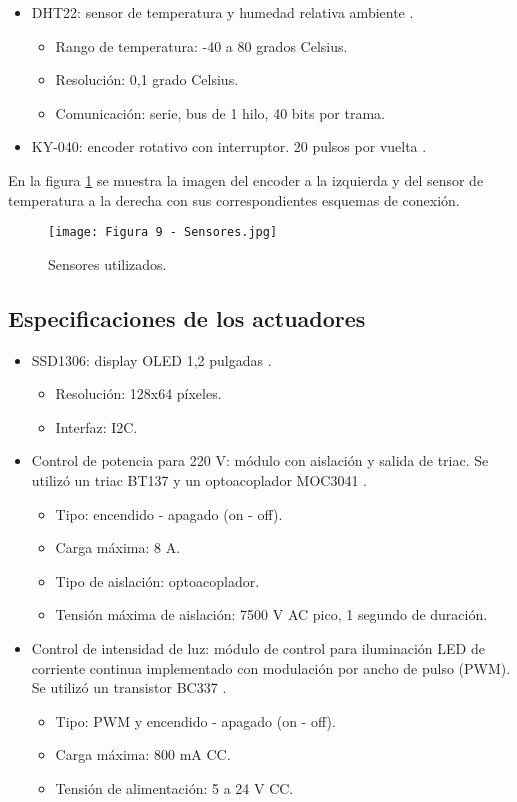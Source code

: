 \begin{itemize}
	\item DHT22: sensor de temperatura y humedad relativa ambiente \citep{15}.
	\begin{itemize}
		\item Rango de temperatura: -40 a 80 grados Celsius.
		\item Resolución: 0,1 grado Celsius.
		\item Comunicación: serie, bus de 1 hilo, 40 bits por trama.
	\end{itemize}
	\item KY-040: encoder rotativo con interruptor. 20 pulsos por vuelta \citep{16}.
\end{itemize}

En la figura \ref{fig:9} se muestra la imagen del encoder a la izquierda y del sensor de temperatura a la derecha con sus correspondientes esquemas de conexión.

\newpage
\begin{figure}[h]
\centering
\texttt{[image: Figura 9 - Sensores.jpg]}
\caption[Sensores]{Sensores utilizados.}
\label{fig:9}
\end{figure}

\subsection{Especificaciones de los actuadores}

\begin{itemize}
\item SSD1306: display OLED 1,2 pulgadas \citep{17}.
	\begin{itemize}
		\item Resolución: 128x64 píxeles.
		\item Interfaz: I2C.
	\end{itemize}
	\item Control de potencia para 220 V: módulo con aislación y salida de triac. Se utilizó un triac BT137 \citep{18} y un optoacoplador MOC3041 \citep{19}.
	\begin{itemize}
		\item Tipo: encendido - apagado (on - off).
		\item Carga máxima: 8 A.
		\item Tipo de aislación: optoacoplador.
		\item Tensión máxima de aislación: 7500 V AC pico, 1 segundo de duración.
	\end{itemize}
	\item Control de intensidad de luz: módulo de control para iluminación LED de corriente continua implementado con modulación por ancho de pulso (PWM). Se utilizó un transistor BC337 \citep{20}.
	\begin{itemize}
		\item Tipo: PWM y encendido - apagado (on - off).
		\item Carga máxima: 800 mA CC.
		\item Tensión de alimentación: 5 a 24 V CC.
	\end{itemize}
\end{itemize}

